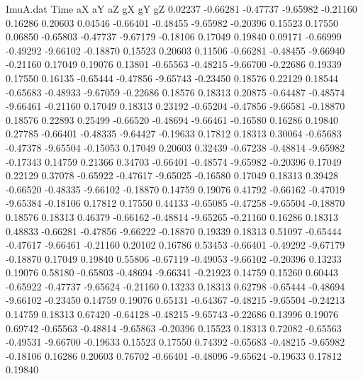 \begin{filecontents}{ImuA.dat}
Time aX aY aZ gX gY gZ
   0.02237   -0.66281   -0.47737   -9.65982   -0.21160    0.16286    0.20603
   0.04546   -0.66401   -0.48455   -9.65982   -0.20396    0.15523    0.17550
   0.06850   -0.65803   -0.47737   -9.67179   -0.18106    0.17049    0.19840
   0.09171   -0.66999   -0.49292   -9.66102   -0.18870    0.15523    0.20603
   0.11506   -0.66281   -0.48455   -9.66940   -0.21160    0.17049    0.19076
   0.13801   -0.65563   -0.48215   -9.66700   -0.22686    0.19339    0.17550
   0.16135   -0.65444   -0.47856   -9.65743   -0.23450    0.18576    0.22129
   0.18544   -0.65683   -0.48933   -9.67059   -0.22686    0.18576    0.18313
   0.20875   -0.64487   -0.48574   -9.66461   -0.21160    0.17049    0.18313
   0.23192   -0.65204   -0.47856   -9.66581   -0.18870    0.18576    0.22893
   0.25499   -0.66520   -0.48694   -9.66461   -0.16580    0.16286    0.19840
   0.27785   -0.66401   -0.48335   -9.64427   -0.19633    0.17812    0.18313
   0.30064   -0.65683   -0.47378   -9.65504   -0.15053    0.17049    0.20603
   0.32439   -0.67238   -0.48814   -9.65982   -0.17343    0.14759    0.21366
   0.34703   -0.66401   -0.48574   -9.65982   -0.20396    0.17049    0.22129
   0.37078   -0.65922   -0.47617   -9.65025   -0.16580    0.17049    0.18313
   0.39428   -0.66520   -0.48335   -9.66102   -0.18870    0.14759    0.19076
   0.41792   -0.66162   -0.47019   -9.65384   -0.18106    0.17812    0.17550
   0.44133   -0.65085   -0.47258   -9.65504   -0.18870    0.18576    0.18313
   0.46379   -0.66162   -0.48814   -9.65265   -0.21160    0.16286    0.18313
   0.48833   -0.66281   -0.47856   -9.66222   -0.18870    0.19339    0.18313
   0.51097   -0.65444   -0.47617   -9.66461   -0.21160    0.20102    0.16786
   0.53453   -0.66401   -0.49292   -9.67179   -0.18870    0.17049    0.19840
   0.55806   -0.67119   -0.49053   -9.66102   -0.20396    0.13233    0.19076
   0.58180   -0.65803   -0.48694   -9.66341   -0.21923    0.14759    0.15260
   0.60443   -0.65922   -0.47737   -9.65624   -0.21160    0.13233    0.18313
   0.62798   -0.65444   -0.48694   -9.66102   -0.23450    0.14759    0.19076
   0.65131   -0.64367   -0.48215   -9.65504   -0.24213    0.14759    0.18313
   0.67420   -0.64128   -0.48215   -9.65743   -0.22686    0.13996    0.19076
   0.69742   -0.65563   -0.48814   -9.65863   -0.20396    0.15523    0.18313
   0.72082   -0.65563   -0.49531   -9.66700   -0.19633    0.15523    0.17550
   0.74392   -0.65683   -0.48215   -9.65982   -0.18106    0.16286    0.20603
   0.76702   -0.66401   -0.48096   -9.65624   -0.19633    0.17812    0.19840

\end{filecontents}
